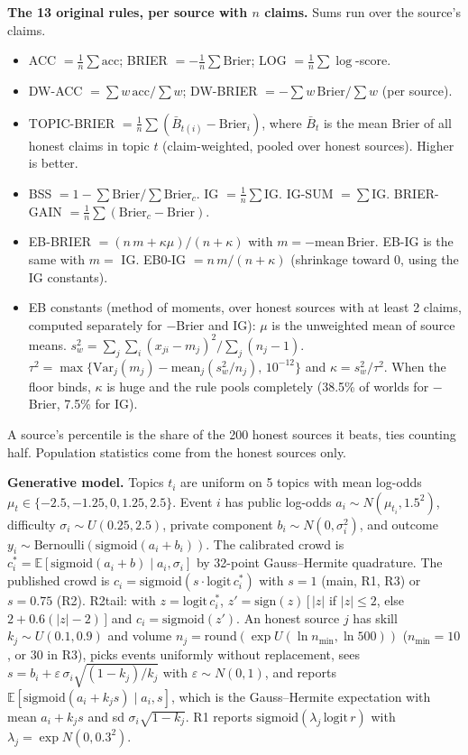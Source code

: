 \documentclass[10pt]{article}
\begin{document}
\textbf{The 13 original rules, per source with $n$ claims.} Sums run over the source's claims.
\begin{itemize}\setlength{\itemsep}{1pt}\setlength{\parskip}{0pt}
\item ACC $=\frac1n\sum \mathrm{acc}$; BRIER $=-\frac1n\sum \mathrm{Brier}$; LOG $=\frac1n\sum \log$-score.
\item DW-ACC $=\sum w\,\mathrm{acc}/\sum w$; DW-BRIER $=-\sum w\,\mathrm{Brier}/\sum w$ (per source).
\item TOPIC-BRIER $=\frac1n\sum (\bar B_{t(i)}-\mathrm{Brier}_i)$, where $\bar B_t$ is the mean Brier of all honest claims in topic $t$ (claim-weighted, pooled over honest sources). Higher is better.
\item BSS $=1-\sum\mathrm{Brier}/\sum\mathrm{Brier}_c$. IG $=\frac1n\sum \mathrm{IG}$. IG-SUM $=\sum \mathrm{IG}$. BRIER-GAIN $=\frac1n\sum(\mathrm{Brier}_c-\mathrm{Brier})$.
\item EB-BRIER $=(n\,m+\kappa\mu)/(n+\kappa)$ with $m=-\mathrm{mean\ Brier}$. EB-IG is the same with $m=$ IG. EB0-IG $=n\,m/(n+\kappa)$ (shrinkage toward 0, using the IG constants).
\item EB constants (method of moments, over honest sources with at least 2 claims, computed separately for $-$Brier and IG): $\mu$ is the unweighted mean of source means. $s^2_w=\sum_j\sum_i (x_{ji}-m_j)^2/\sum_j(n_j-1)$. $\tau^2=\max\{\mathrm{Var}_j(m_j)-\mathrm{mean}_j(s^2_w/n_j),\,10^{-12}\}$ and $\kappa=s^2_w/\tau^2$. When the floor binds, $\kappa$ is huge and the rule pools completely (38.5\% of worlds for $-$Brier, 7.5\% for IG).
\end{itemize}
A source's percentile is the share of the 200 honest sources it beats, ties counting half. Population statistics come from the honest sources only.

\textbf{Generative model.} Topics $t_i$ are uniform on 5 topics with mean log-odds $\mu_t\in\{-2.5,-1.25,0,1.25,2.5\}$. Event $i$ has public log-odds $a_i\sim N(\mu_{t_i},1.5^2)$, difficulty $\sigma_i\sim U(0.25,2.5)$, private component $b_i\sim N(0,\sigma_i^2)$, and outcome $y_i\sim\mathrm{Bernoulli}(\mathrm{sigmoid}(a_i+b_i))$. The calibrated crowd is $c^\ast_i=\mathbb{E}[\mathrm{sigmoid}(a_i+b)\mid a_i,\sigma_i]$ by 32-point Gauss--Hermite quadrature. The published crowd is $c_i=\mathrm{sigmoid}(s\cdot\mathrm{logit}\,c^\ast_i)$ with $s=1$ (main, R1, R3) or $s=0.75$ (R2). R2tail: with $z=\mathrm{logit}\,c^\ast_i$, $z'=\mathrm{sign}(z)\,[\,|z|$ if $|z|\le2$, else $2+0.6(|z|-2)\,]$ and $c_i=\mathrm{sigmoid}(z')$. An honest source $j$ has skill $k_j\sim U(0.1,0.9)$ and volume $n_j=\mathrm{round}(\exp U(\ln n_{\min},\ln 500))$ ($n_{\min}=10$, or 30 in R3), picks events uniformly without replacement, sees $s=b_i+\varepsilon\,\sigma_i\sqrt{(1-k_j)/k_j}$ with $\varepsilon\sim N(0,1)$, and reports $\mathbb{E}[\mathrm{sigmoid}(a_i+k_js)\mid a_i,s]$, which is the Gauss--Hermite expectation with mean $a_i+k_js$ and sd $\sigma_i\sqrt{1-k_j}$. R1 reports $\mathrm{sigmoid}(\lambda_j\,\mathrm{logit}\,r)$ with $\lambda_j=\exp N(0,0.3^2)$.
\end{document}
